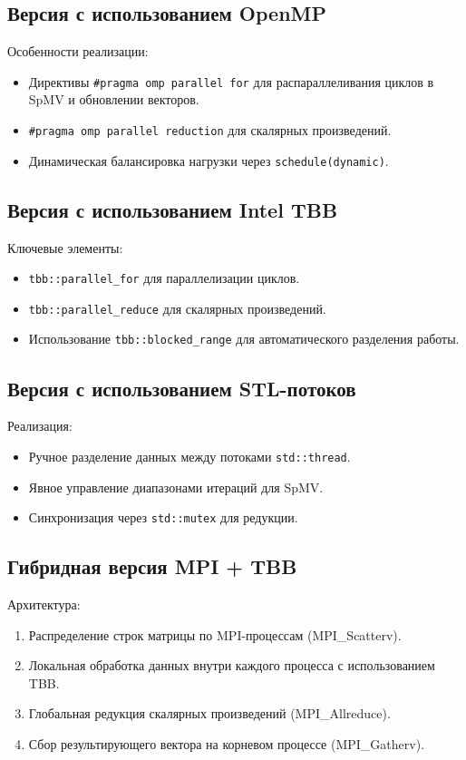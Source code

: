 \documentclass[12pt]{article}
\begin{document}
\subsection{Версия с использованием OpenMP}

Особенности реализации:
\begin{itemize}
    \item Директивы \texttt{\#pragma omp parallel for} для распараллеливания циклов в SpMV и обновлении векторов.
    \item \texttt{\#pragma omp parallel reduction} для скалярных произведений.
    \item Динамическая балансировка нагрузки через \texttt{schedule(dynamic)}.
\end{itemize}

\subsection{Версия с использованием Intel TBB}

Ключевые элементы:
\begin{itemize}
    \item \texttt{tbb::parallel\_for} для параллелизации циклов.
    \item \texttt{tbb::parallel\_reduce} для скалярных произведений.
    \item Использование \texttt{tbb::blocked\_range} для автоматического разделения работы.
\end{itemize}

\subsection{Версия с использованием STL-потоков}

Реализация:
\begin{itemize}
    \item Ручное разделение данных между потоками \texttt{std::thread}.
    \item Явное управление диапазонами итераций для SpMV.
    \item Синхронизация через \texttt{std::mutex} для редукции.
\end{itemize}

\subsection{Гибридная версия MPI + TBB}

Архитектура:
\begin{enumerate}
    \item Распределение строк матрицы по MPI-процессам (MPI\_Scatterv).
    \item Локальная обработка данных внутри каждого процесса с использованием TBB.
    \item Глобальная редукция скалярных произведений (MPI\_Allreduce).
    \item Сбор результирующего вектора на корневом процессе (MPI\_Gatherv).
\end{enumerate}
\end{document}
